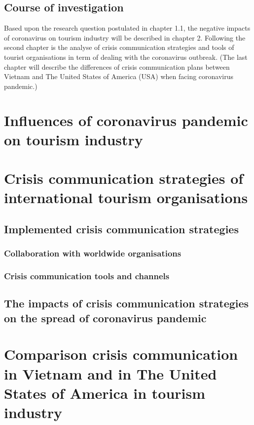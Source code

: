 \documentclass[draft=false
              ,paper=a4
              ,twoside=false
              ,fontsize=12pt
              ,headsepline
              ,BCOR10mm
              ,DIV11
              ]{scrbook}
\begin{document}
\section{Course of investigation}

Based upon the research question postulated in chapter 1.1, the negative impacts of coronavirus on tourism industry will be described in chapter 2. Following the second chapter is the analyse of crisis communication strategies and tools of tourist organisations in term of dealing with the coronavirus outbreak. (The last chapter will describe the differences of crisis communication plans between Vietnam and The United States of America (USA) when facing coronavirus pandemic.)

\chapter{Influences of coronavirus pandemic on tourism industry}

\chapter{Crisis communication strategies of international tourism organisations}

\section{Implemented crisis communication strategies}
\subsection{Collaboration with worldwide organisations}
\subsection{Crisis communication tools and channels}

\section{The impacts of crisis communication strategies on the spread of coronavirus pandemic}

\chapter{Comparison crisis communication in Vietnam and in The United States of America in tourism industry}
\end{document}
